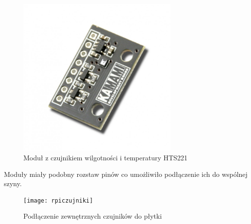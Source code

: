 \begin{figure}[H]
	\centering
		\includegraphics[width=8cm]{hts221}
	\caption{Moduł z czujnikiem wilgotności i temperatury HTS221} 
	\label{pic:hts221}
\end{figure}

Moduły miały podobny rozstaw pinów co umożliwiło podłączenie ich do wspólnej szyny.

\begin{figure}[H]
	\centering
		\texttt{[image: rpiczujniki]}
	\caption{Podłączenie zewnętrznych czujników do płytki} 
	\label{pic:rpiczujniki}
\end{figure}
